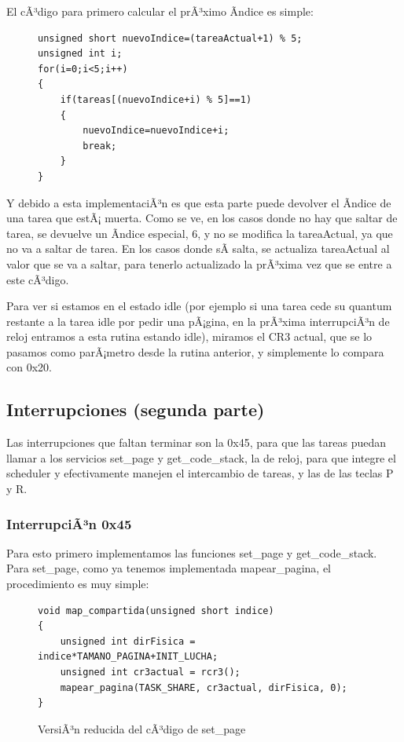 \documentclass[10pt, a4paper]{article}
\begin{document}
El cÃ³digo para primero calcular el prÃ³ximo Ã­ndice es simple:
\begin{figure}[H]
\begin{center}
\begin{verbatim}
unsigned short nuevoIndice=(tareaActual+1) % 5;
unsigned int i;
for(i=0;i<5;i++)
{
	if(tareas[(nuevoIndice+i) % 5]==1)
	{
		nuevoIndice=nuevoIndice+i;
		break;
	}
}
\end{verbatim}
\end{center}
\end{figure}
Y debido a esta implementaciÃ³n es que esta parte puede devolver el Ã­ndice de una tarea que estÃ¡ muerta.
Como se ve, en los casos donde no hay que saltar de tarea, se devuelve un Ã­ndice especial, 6, y no se modifica la tareaActual, ya que no va a saltar de tarea. En los casos donde sÃ­ salta, se actualiza tareaActual al valor que se va a saltar, para tenerlo actualizado la prÃ³xima vez que se entre a este cÃ³digo.

Para ver si estamos en el estado idle (por ejemplo si una tarea cede su quantum restante a la tarea idle por pedir una pÃ¡gina, en la prÃ³xima interrupciÃ³n de reloj entramos a esta rutina estando idle), miramos el CR3 actual, que se lo pasamos como parÃ¡metro desde la rutina anterior, y simplemente lo compara con 0x20.

\subsection{Interrupciones (segunda parte)}
Las interrupciones que faltan terminar son la 0x45, para que las tareas puedan llamar a los servicios set\_page y get\_code\_stack, la de reloj, para que integre el scheduler y efectivamente manejen el intercambio de tareas, y las de las teclas P y R.

\subsubsection*{InterrupciÃ³n 0x45}
Para esto primero implementamos las funciones set\_page y get\_code\_stack. Para set\_page, como ya tenemos implementada mapear\_pagina, el procedimiento es muy simple:

\begin{figure}[!h]
\begin{center}
\begin{verbatim}
void map_compartida(unsigned short indice)
{	
	unsigned int dirFisica = indice*TAMANO_PAGINA+INIT_LUCHA;
	unsigned int cr3actual = rcr3();
	mapear_pagina(TASK_SHARE, cr3actual, dirFisica, 0);	
}
\end{verbatim}
\caption{VersiÃ³n reducida del cÃ³digo de set\_page}
\end{center}
\end{figure}
\end{document}
